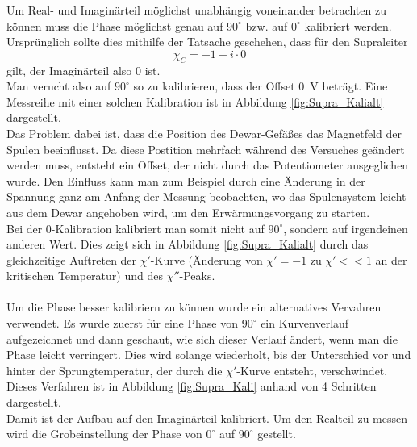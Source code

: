 \documentclass[12pt,a4paper]{article}
\begin{document}
Um Real- und Imaginärteil möglichst unabhängig voneinander betrachten zu können muss die Phase möglichst genau auf $90^\circ$ bzw. auf $0^\circ$ kalibriert werden. Ursprünglich sollte dies mithilfe der Tatsache geschehen, dass für den Supraleiter
\begin{equation}
\chi_C = -1-i\cdot 0
\end{equation}
gilt, der Imaginärteil also 0 ist.\\
Man verucht also auf $90^\circ$ so zu kalibrieren, dass der Offset \SI{0}{V} beträgt. Eine Messreihe mit einer solchen Kalibration ist in Abbildung \ref{fig:Supra_Kalialt} dargestellt.\\
Das Problem dabei ist, dass die Position des Dewar-Gefäßes das Magnetfeld der Spulen beeinflusst. Da diese Postition mehrfach während des Versuches geändert werden muss, entsteht ein Offset, der nicht durch das Potentiometer ausgeglichen wurde. Den Einfluss kann man zum Beispiel durch eine Änderung in der Spannung ganz am Anfang der Messung beobachten, wo das Spulensystem leicht aus dem Dewar angehoben wird, um den Erwärmungsvorgang zu starten.\\
Bei der 0-Kalibration kalibriert man somit nicht auf $90^\circ$, sondern auf irgendeinen anderen Wert. Dies zeigt sich in Abbildung \ref{fig:Supra_Kalialt} durch das gleichzeitige Auftreten der $\chi'$-Kurve (Änderung von $\chi' = -1$ zu $\chi' << 1$ an der kritischen Temperatur) und des $\chi''$-Peaks.\\
\\
Um die Phase besser kalibriern zu können wurde ein alternatives Vervahren verwendet. Es wurde zuerst für eine Phase von $90^\circ$ ein Kurvenverlauf aufgezeichnet und dann geschaut, wie sich dieser Verlauf ändert, wenn man die Phase leicht verringert. Dies wird solange wiederholt, bis der Unterschied vor und hinter der Sprungtemperatur, der durch die $\chi'$-Kurve entsteht, verschwindet. Dieses Verfahren ist in Abbildung \ref{fig:Supra_Kali} anhand von 4 Schritten dargestellt.\\
Damit ist der Aufbau auf den Imaginärteil kalibriert. Um den Realteil zu messen wird die Grobeinstellung der Phase von $0^\circ$ auf $90^\circ$ gestellt.
\end{document}
